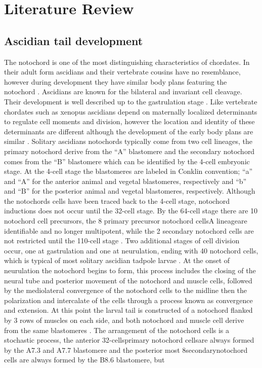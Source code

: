 \chapter{Literature Review}
\section{Ascidian tail development}

The notochord is one of the most distinguishing characteristics of chordates. In their adult form ascidians and their vertebrate cousins have no resemblance, however during development they have similar body plans featuring the notochord \cite{jeffery_minireview_2002}. Ascidians are known for the bilateral and invariant cell cleavage. Their development is well described up to the gastrulation stage \cite{nishida_cell_1983,nishida_cell_1985,nishida_cell_1987}. Like vertebrate chordates such as xenopus ascidians depend on maternally localized determinants to regulate cell moments and division, however the location and identity of these determinants are different although the development of the early body plans are similar \cite{lemaire_ascidians_2008}. Solitary ascidians notochords typically come from two cell lineages, the primary notochord derive from the ``A'' blastomere and the secondary notochord comes from the ``B'' blastomere \cite{nishida_cell_1983} which can be identified by the 4-cell embryonic stage. At the 4-cell stage the blastomeres are labeled in Conklin \cite{conklin_organization_1905} convention; ``a'' and ``A'' for the anterior animal and vegetal blastomeres, respectively and ``b'' and ``B'' for the posterior animal and vegetal blastomeres, respectively. Although the notochords cells have been traced back to the 4-cell stage, notochord inductions does not occur until the 32-cell stage. By the 64-cell stage there are 10 notochord cell precursors, the 8 primary precursor notochord cells\textemdash A lineage\textemdash are identifiable and no longer multipotent, while the 2 secondary notochord cells are not restricted until the 110-cell stage \cite{nishida_cell_1985,yasuo_ascidian_1994,yasuo_conservation_1998,lemaire_unfolding_2009}. Two additional stages of cell division occur, one at gastrulation and one at neurulation, ending with 40 notochord cells, which is typical of most solitary ascidian tadpole larvae \cite{conklin_organization_1905}. At the onset of neurulation the notochord begins to form, this process includes the closing of the neural tube and posterior movement of the notochord and muscle cells, followed by the mediolateral convergence of the notochord cells to the midline then the polarization and intercalate of the cells through a process known as convergence and extension\cite{swalla_mechanisms_1993}. At this point the larval tail is constructed of a notochord flanked by 3 rows of muscles on each side, and both notochord and muscle cell derive from the same blastomeres \cite{nishida_cell_1985}. The arrangement of the notochord cells is a stochastic process, the anterior 32-cells\textemdash primary notochord cells\textemdash are always formed by the A7.3 and A7.7 blastomere and the posterior most 8\textemdash secondary\textemdash notochord cells are always formed by the B8.6 blastomere, but 